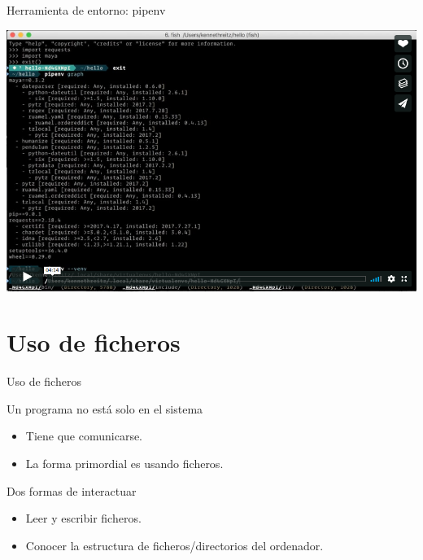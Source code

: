 \documentclass[bigger,unknownkeysallowed]{beamer}
\begin{document}
\begin{frame}[label={sec:orgfa304b6}]{Herramienta de entorno: pipenv}
\begin{center}
\href{https://vimeo.com/233134524}{\includegraphics[width=\textwidth]{pipenv.png}}
\end{center}
\end{frame}


\section{Uso de ficheros}
\label{sec:org561d534}

\begin{frame}[label={sec:org24c7fa9}]{Uso de ficheros}
\begin{block}{Un programa no está solo en el sistema}
\begin{itemize}
\item Tiene que comunicarse.

\item La forma primordial es usando ficheros.
\end{itemize}
\end{block}

\begin{block}{Dos formas de interactuar}
\begin{itemize}
\item Leer y escribir ficheros.

\item Conocer la estructura de ficheros/directorios del ordenador.
\end{itemize}
\end{block}
\end{frame}
\end{document}
